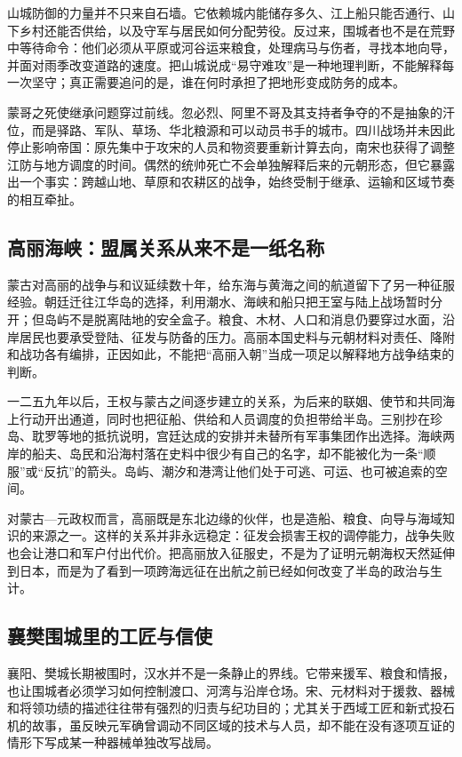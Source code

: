 山城防御的力量并不只来自石墙。它依赖城内能储存多久、江上船只能否通行、山下乡村还能否供给，以及守军与居民如何分配劳役。反过来，围城者也不是在荒野中等待命令：他们必须从平原或河谷运来粮食，处理病马与伤者，寻找本地向导，并面对雨季改变道路的速度。把山城说成“易守难攻”是一种地理判断，不能解释每一次坚守；真正需要追问的是，谁在何时承担了把地形变成防务的成本。

蒙哥之死使继承问题穿过前线。忽必烈、阿里不哥及其支持者争夺的不是抽象的汗位，而是驿路、军队、草场、华北粮源和可以动员书手的城市。四川战场并未因此停止影响帝国：原先集中于攻宋的人员和物资要重新计算去向，南宋也获得了调整江防与地方调度的时间。偶然的统帅死亡不会单独解释后来的元朝形态，但它暴露出一个事实：跨越山地、草原和农耕区的战争，始终受制于继承、运输和区域节奏的相互牵扯。

\subsection{高丽海峡：盟属关系从来不是一纸名称}

蒙古对高丽的战争与和议延续数十年，给东海与黄海之间的航道留下了另一种征服经验。朝廷迁往江华岛的选择，利用潮水、海峡和船只把王室与陆上战场暂时分开；但岛屿不是脱离陆地的安全盒子。粮食、木材、人口和消息仍要穿过水面，沿岸居民也要承受登陆、征发与防备的压力。高丽本国史料与元朝材料对责任、降附和战功各有编排，正因如此，不能把“高丽入朝”当成一项足以解释地方战争结束的判断。

一二五九年以后，王权与蒙古之间逐步建立的关系，为后来的联姻、使节和共同海上行动开出通道，同时也把征船、供给和人员调度的负担带给半岛。三别抄在珍岛、耽罗等地的抵抗说明，宫廷达成的安排并未替所有军事集团作出选择。海峡两岸的船夫、岛民和沿海村落在史料中很少有自己的名字，却不能被化为一条“顺服”或“反抗”的箭头。岛屿、潮汐和港湾让他们处于可逃、可运、也可被追索的空间。

对蒙古—元政权而言，高丽既是东北边缘的伙伴，也是造船、粮食、向导与海域知识的来源之一。这样的关系并非永远稳定：征发会损害王权的调停能力，战争失败也会让港口和军户付出代价。把高丽放入征服史，不是为了证明元朝海权天然延伸到日本，而是为了看到一项跨海远征在出航之前已经如何改变了半岛的政治与生计。

\subsection{襄樊围城里的工匠与信使}

襄阳、樊城长期被围时，汉水并不是一条静止的界线。它带来援军、粮食和情报，也让围城者必须学习如何控制渡口、河湾与沿岸仓场。宋、元材料对于援救、器械和将领功绩的描述往往带有强烈的归责与纪功目的；尤其关于西域工匠和新式投石机的故事，虽反映元军确曾调动不同区域的技术与人员，却不能在没有逐项互证的情形下写成某一种器械单独改写战局。

